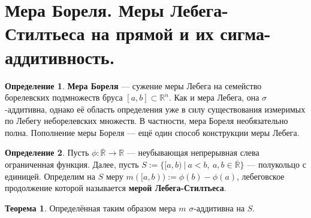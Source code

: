 \documentclass[11pt,a4paper]{report}
\def\Real{\mathbb{R}}
\theoremstyle{definition}
\theoremstyle{definition}
\newtheorem{theorem}{Теорема}[section]
\theoremstyle{definition}
\newtheorem{definition}{Определение}[section]
\begin{document}
	\section{Мера Бореля. Меры Лебега-Стилтьеса на прямой и их сигма-аддитивность.}
	\begin{definition}
		\textbf{Мера Бореля} — сужение меры Лебега на семейство борелевских подмножеств бруса $ [a, b] \subset \Real^{n} $.
		Как и мера Лебега, она $ \sigma $-аддитивна, однако её область определения уже в силу существования измеримых по Лебегу неборелевских множеств. В частности, мера Бореля необязательно полна. Пополнение меры Бореля — ещё один способ конструкции меры Лебега. 
	\end{definition}
	\begin{definition}
		Пусть $ \phi: \overline{\Real} \to \Real $ — неубывающая непрерывная слева ограниченная функция. Далее, пусть $ S := \{[a, b)\ |\ a < b,\ a, b \in \overline{\Real} \} $ — полукольцо с единицей. Определим на $ S $ меру $ m([a, b)) := \phi(b) - \phi(a) $, лебеговское продолжение которой называется \textbf{мерой Лебега-Стилтьеса}.
	\end{definition}
	\begin{theorem}
		Определённая таким образом мера $ m $ $ \sigma $-аддитивна на $ S $.
	\end{theorem}
\end{document}
